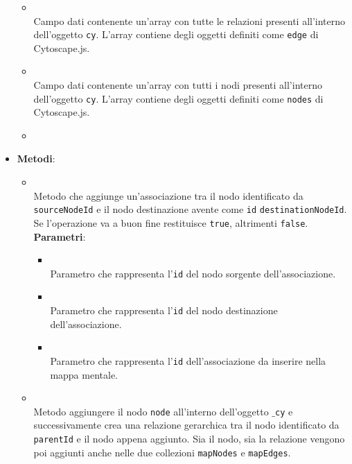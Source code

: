 \begin{itemize}
\begin{itemize}
\item {}
\\ Campo dati contenente un'array con tutte le relazioni presenti all'interno dell'oggetto \texttt{cy}. L'array contiene degli oggetti definiti come \texttt{edge} di Cytoscape.js.
\item {}
\\ Campo dati contenente un'array con tutti i nodi presenti all'interno dell'oggetto \texttt{cy}. L'array contiene degli oggetti definiti come \texttt{nodes} di Cytoscape.js.
\item {}
\\ \dpQField
\end{itemize}
\item \textbf{Metodi}:
\begin{itemize}
\item {}
\\ Metodo che aggiunge un'associazione tra il nodo identificato da \texttt{sourceNodeId} e il nodo destinazione avente come \texttt{id} \texttt{destinationNodeId}. Se l'operazione va a buon fine restituisce \texttt{true}, altrimenti \texttt{false}.
\\ \textbf{Parametri}:
\begin{itemize}
\item {}
\\ Parametro che rappresenta l'\texttt{id} del nodo sorgente dell'associazione.
\item {}
\\ Parametro che rappresenta l'\texttt{id} del nodo destinazione dell'associazione.
\item {}
\\ Parametro che rappresenta l'\texttt{id} dell'associazione da inserire nella mappa mentale.
\end{itemize}
\item {}
\\ Metodo aggiungere il nodo \texttt{node} all'interno dell'oggetto \texttt{$\_$cy} e successivamente crea una relazione gerarchica tra il nodo identificato da \texttt{parentId} e il nodo appena aggiunto. Sia il nodo, sia la relazione vengono poi aggiunti anche nelle due collezioni \texttt{mapNodes} e \texttt{mapEdges}.

\end{itemize}
\end{itemize}

